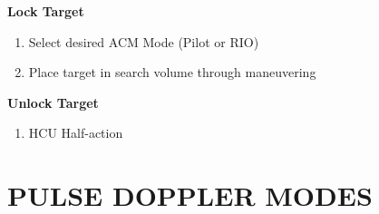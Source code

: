 \documentclass[fontSpartan]{TechCheck}
\begin{document}
\begin{tableitemize}
{\begin{subitemize}
			\item \textbf{Lock Target}
			\begin{enumerate}
				\item Select desired ACM Mode (Pilot or RIO)
				\item Place target in search volume through maneuvering
			\end{enumerate}
			\item \textbf{Unlock Target}
			\begin{enumerate}[resume]
				\item HCU Half-action
			\end{enumerate}
		\end{subitemize}}
	\end{tableitemize}

	\clearpage

	\section{PULSE DOPPLER MODES}
\end{document}
